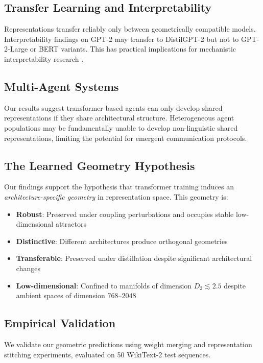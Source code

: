 \documentclass[10pt]{article} %
\theoremstyle{plain}
\theoremstyle{definition}
\theoremstyle{remark}
\begin{document}
\subsection{Transfer Learning and Interpretability}

Representations transfer reliably only between geometrically compatible models. Interpretability findings on GPT-2 may transfer to DistilGPT-2 but not to GPT-2-Large or BERT variants. This has practical implications for mechanistic interpretability research \citep{elhage2021mathematical}.

\subsection{Multi-Agent Systems}

Our results suggest transformer-based agents can only develop shared representations if they share architectural structure. Heterogeneous agent populations may be fundamentally unable to develop non-linguistic shared representations, limiting the potential for emergent communication protocols.

\subsection{The Learned Geometry Hypothesis}

Our findings support the hypothesis that transformer training induces an \textit{architecture-specific geometry} in representation space. This geometry is:
\begin{itemize}
    \item \textbf{Robust}: Preserved under coupling perturbations and occupies stable low-dimensional attractors
    \item \textbf{Distinctive}: Different architectures produce orthogonal geometries
    \item \textbf{Transferable}: Preserved under distillation despite significant architectural changes
    \item \textbf{Low-dimensional}: Confined to manifolds of dimension $D_2 \lesssim 2.5$ despite ambient spaces of dimension $768$--$2048$
\end{itemize}


\subsection{Empirical Validation}

We validate our geometric predictions using weight merging and representation stitching experiments, evaluated on 50 WikiText-2 test sequences.
\end{document}

